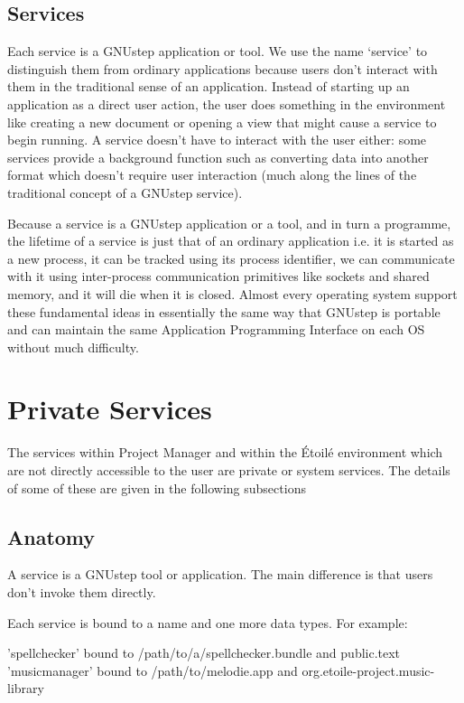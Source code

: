 \documentclass[11pt]{report}
\newcommand{\etoile}{\'Etoil\'e\xspace}
\newcommand{\proman}{Project Manager\xspace}
\newcommand{\gnustep}{GNUstep\xspace}
\begin{document}
\subsection{Services}
Each service is a GNUstep application or tool. We use the name `service' to distinguish them from ordinary applications because users don't interact with them in the traditional sense of an application. Instead of starting up an application as a direct user action, the user does something in the environment like creating a new document or opening a view that might cause a service to begin running. A service doesn't have to interact with the user either: some services provide a background function such as converting data into another format which doesn't require user interaction (much along the lines of the traditional concept of a \gnustep service).

Because a service is a GNUstep application or a tool, and in turn a programme, the lifetime of a service is just that of an ordinary application i.e. it is started as a new process, it can be tracked using its process identifier, we can communicate with it using inter-process communication primitives like sockets and shared memory, and it will die when it is closed. Almost every operating system support these fundamental ideas in essentially the same way that GNUstep is portable and can maintain the same Application Programming Interface on each OS without much difficulty.  

\section{Private Services}

The services within \proman and within the \etoile environment which are not directly accessible to the user are private or system services. The details of some of these are given in the following subsections

\subsection{Anatomy}

A service is a \gnustep tool or application. The main difference is that users don't invoke them directly. 

Each service is bound to a name and one more data types. For example:

	'spellchecker' bound to /path/to/a/spellchecker.bundle and public.text 
	'musicmanager' bound to /path/to/melodie.app and org.etoile-project.music-library
\end{document}
